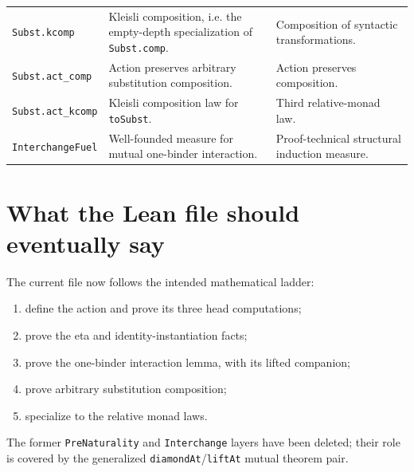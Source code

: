 \documentclass[11pt]{article}
\newcommand{\Code}[1]{\texttt{#1}}
\begin{document}
\begin{longtable}{>{\raggedright\arraybackslash}p{}
                  >{\raggedright\arraybackslash}p{}
                  >{\raggedright\arraybackslash}p{}}
\Code{Subst.kcomp} & Kleisli composition, i.e. the empty-depth specialization
of \Code{Subst.comp}. & Composition of syntactic transformations. \\

\Code{Subst.act\_comp} & Action preserves arbitrary substitution
composition. & Action preserves composition. \\

\Code{Subst.act\_kcomp} & Kleisli composition law for \Code{toSubst}. &
Third relative-monad law. \\

\Code{InterchangeFuel} & Well-founded measure for mutual one-binder
interaction. & Proof-technical structural induction measure. \\
\bottomrule
\end{longtable}

\section{What the Lean file should eventually say}

The current file now follows the intended mathematical ladder:

\begin{enumerate}
\item define the action and prove its three head computations;
\item prove the eta and identity-instantiation facts;
\item prove the one-binder interaction lemma, with its lifted companion;
\item prove arbitrary substitution composition;
\item specialize to the relative monad laws.
\end{enumerate}

The former \Code{PreNaturality} and \Code{Interchange} layers have been
deleted; their role is covered by the generalized \Code{diamondAt}/\Code{liftAt}
mutual theorem pair.
\end{document}
